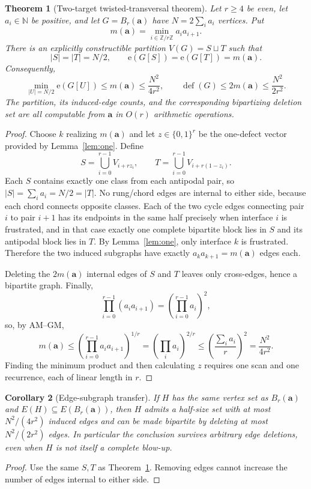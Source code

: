 \documentclass[11pt,a4paper]{article}
\newtheorem{theorem}{Theorem}[section]
\newtheorem{corollary}[theorem]{Corollary}
\newcommand{\edges}{\mathrm e}
\newcommand{\defect}{\operatorname{def}}
\newcommand{\card}[1]{\lvert#1\rvert}
\newcommand{\N}{\mathbb N}
\begin{document}
\begin{theorem}[Two-target twisted-transversal theorem]\label{thm:main}
Let $r\ge4$ be even, let $a_i\in\N$ be positive, and let $G=B_r(\mathbf a)$ have $N=2\sum_i a_i$ vertices. Put
\[
  m(\mathbf a)=\min_{i\in\mathbb Z/r\mathbb Z}a_ia_{i+1}.
\]
There is an explicitly constructible partition $V(G)=S\sqcup T$ such that
\begin{equation}\label{eq:certificate}
 \card S=\card T=N/2,
 \qquad \edges(G[S])=\edges(G[T])=m(\mathbf a).
\end{equation}
Consequently,
\begin{equation}\label{eq:mainineq}
 \min_{\card U=N/2}\edges(G[U])\le m(\mathbf a)\le\frac{N^2}{4r^2},
 \qquad
 \defect(G)\le2m(\mathbf a)\le\frac{N^2}{2r^2}.
\end{equation}
The partition, its induced-edge counts, and the corresponding bipartizing deletion set are all computable from $\mathbf a$ in $O(r)$ arithmetic operations.
\end{theorem}
\begin{proof}
Choose $k$ realizing $m(\mathbf a)$ and let $z\in\{0,1\}^r$ be the one-defect vector provided by Lemma~\ref{lem:one}. Define
\[
 S=\bigcup_{i=0}^{r-1}V_{i+rz_i},\qquad
 T=\bigcup_{i=0}^{r-1}V_{i+r(1-z_i)}.
\]
Each $S$ contains exactly one class from each antipodal pair, so
$\card S=\sum_i a_i=N/2=\card T$. No rung/chord edges are internal to either side, because each chord connects opposite classes. Each of the two cycle edges connecting pair $i$ to pair $i+1$ has its endpoints in the same half precisely when interface $i$ is frustrated, and in that case exactly one complete bipartite block lies in $S$ and its antipodal block lies in $T$. By Lemma~\ref{lem:one}, only interface $k$ is frustrated. Therefore the two induced subgraphs have exactly $a_ka_{k+1}=m(\mathbf a)$ edges each.

Deleting the $2m(\mathbf a)$ internal edges of $S$ and $T$ leaves only cross-edges, hence a bipartite graph. Finally,
\[
 \prod_{i=0}^{r-1}(a_ia_{i+1})=\left(\prod_{i=0}^{r-1}a_i\right)^2,
\]
so, by AM--GM,
\[
 m(\mathbf a)\le\left(\prod_{i=0}^{r-1}a_ia_{i+1}\right)^{1/r}
 =\left(\prod_i a_i\right)^{2/r}
 \le\left(\frac{\sum_i a_i}{r}\right)^2
 =\frac{N^2}{4r^2}.
\]
Finding the minimum product and then calculating $z$ requires one scan and one recurrence, each of linear length in $r$.
\end{proof}
\begin{corollary}[Edge-subgraph transfer]\label{cor:sub}
If $H$ has the same vertex set as $B_r(\mathbf a)$ and $E(H)\subseteq E(B_r(\mathbf a))$, then $H$ admits a half-size set with at most $N^2/(4r^2)$ induced edges and can be made bipartite by deleting at most $N^2/(2r^2)$ edges. In particular the conclusion survives arbitrary edge deletions, even when $H$ is not itself a complete blow-up.
\end{corollary}
\begin{proof}
Use the same $S,T$ as Theorem~\ref{thm:main}. Removing edges cannot increase the number of edges internal to either side.
\end{proof}
\end{document}
